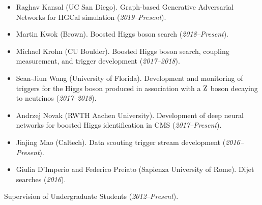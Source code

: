 \documentclass[12pt]{res}
\begin{document}
\begin{resume}
\begin{itemize}
\item Raghav Kansal (UC San Diego). Graph-based Generative Adversarial
  Networks for HGCal simulation (\textit{2019--Present}).
\item Martin Kwok (Brown). Boosted Higgs boson search (\textit{2018--Present}).
\item Michael Krohn (CU Boulder). Boosted Higgs boson search, coupling
  measurement, and trigger development (\textit{2017--2018}).
\item Sean-Jiun Wang (University of Florida). Development and
  monitoring of triggers for the Higgs boson produced in association with a
  $\mathrm{Z}$ boson decaying to neutrinos (\textit{2017--2018}).
\item Andrzej Novak (RWTH Aachen University). Development of deep neural
  networks for boosted Higgs identification in CMS (\textit{2017--Present}).
\item Jiajing Mao (Caltech). Data scouting trigger stream development (\textit{2016--Present}).
\item Giulia D'Imperio and Federico Preiato (Sapienza University of Rome). Dijet searches (\textit{2016}).
\end{itemize}

Supervision of Undergraduate Students (\textit{2012--Present}).


\end{resume}
\end{document}
